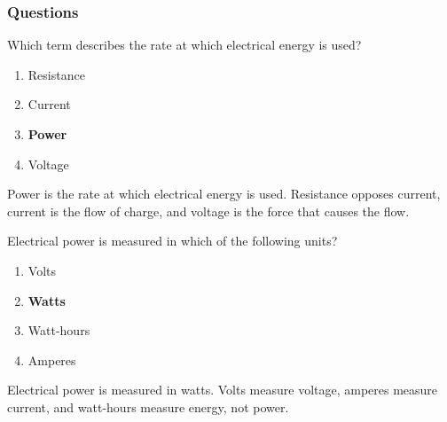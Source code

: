 \subsubsection{Questions}


\begin{tcolorbox}[colback=gray!10!white,colframe=black!75!black,title={T5A10}]
    Which term describes the rate at which electrical energy is used?
    \begin{enumerate}[label=\Alph*),noitemsep]
        \item Resistance
        \item Current
        \item \textbf{Power}
        \item Voltage
    \end{enumerate}
\end{tcolorbox}
Power is the rate at which electrical energy is used. Resistance opposes current, current is the flow of charge, and voltage is the force that causes the flow.

\begin{tcolorbox}[colback=gray!10!white,colframe=black!75!black,title={T5A02}]
    Electrical power is measured in which of the following units?
    \begin{enumerate}[label=\Alph*),noitemsep]
        \item Volts
        \item \textbf{Watts}
        \item Watt-hours
        \item Amperes
    \end{enumerate}
    \end{tcolorbox}
    Electrical power is measured in watts. Volts measure voltage, amperes measure current, and watt-hours measure energy, not power.
    